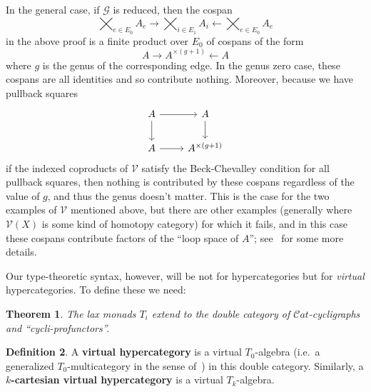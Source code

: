 \documentclass{article}
\newtheorem{thm}{Theorem}[section]
\theoremstyle{definition}
\newtheorem{defn}[thm]{Definition}
\theoremstyle{remark}
\def\G{\mathcal{G}}
\def\V{\mathscr{V}}
\def\Cat{\ensuremath{\mathcal{C}\mathit{at}}}
\let\ot\leftarrow
\begin{document}
In the general case, if $\G$ is reduced, then the cospan
\[ \bigtimes_{e\in E_0} A_e \to \bigtimes_{i\in E_1} A_{i} \ot \bigtimes_{e\in E_0} A_e \]
in the above proof is a finite product over $E_0$ of cospans of the form
\[ A \to A^{\times (g+1)} \ot A \]
where $g$ is the genus of the corresponding edge.
In the genus zero case, these cospans are all identities and so contribute nothing.
Moreover, because we have pullback squares
\[
\begin{tikzcd}
  A \ar[r] \ar[d] & A \ar[d] \\ A \ar[r] & A^{\times (g+1)}
\end{tikzcd}
\]
if the indexed coproducts of $\V$ satisfy the Beck-Chevalley condition for all pullback squares, then nothing is contributed by these cospans regardless of the value of $g$, and thus the genus doesn't matter.
This is the case for the two examples of $\V$ mentioned above, but there are other examples (generally where $\V(X)$ is some kind of homotopy category) for which it fails, and in this case these cospans contribute factors of the ``loop space of $A$''; see~\cite{ps:indexed} for some more details.

Our type-theoretic syntax, however, will be not for hypercategories but for \emph{virtual} hypercategories.
To define these we need:

\begin{thm}
  The lax monads $T_i$ extend to the double category of $\Cat$-cycligraphs and ``cycli-profunctors''.
\end{thm}

\begin{defn}
  A \textbf{virtual hypercategory} is a virtual $T_0$-algebra (i.e.\ a generalized $T_0$-multicategory in the sense of~\cite{cs:multicats}) in this double category.
  Similarly, a \textbf{$k$-cartesian virtual hypercategory} is a virtual $T_k$-algebra.
\end{defn}
\end{document}
